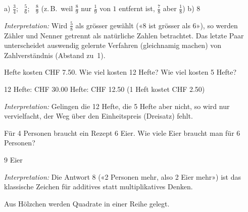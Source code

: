 \documentclass[11pt]{exam}
\newcommand{\aufgabe}[1]{%
  \needspace{8\baselineskip}%
  \renewcommand{\questionlabel}{\textbf{#1}}%
  \question}
\newcommand{\kaestchen}{\fbox{\rule{0pt}{1.1em}\hspace{1.6em}}}
\newcommand{\raum}[1]{\ifprintanswers\else\fillwithgrid{#1}\fi}
\newcommand{\diagnose}[1]{\par\smallskip\textit{Interpretation:} #1}
\begin{document}
\begin{questions}
\aufgabe{3.2}
\begin{solution}
  a) $\frac{3}{4}$; \ $\frac{5}{6}$; \ $\frac{8}{9}$ (z.\,B.\ weil $\frac{8}{9}$
  nur $\frac{1}{9}$ von $1$ entfernt ist, $\frac{7}{8}$ aber $\frac{1}{8}$)
  \qquad b) $8$
  \diagnose{Wird $\frac{5}{8}$ als grösser gewählt («8 ist grösser als 6»), so
  werden Zähler und Nenner getrennt als natürliche Zahlen betrachtet. Das letzte
  Paar unterscheidet auswendig gelernte Verfahren (gleichnamig machen) von
  Zahlverständnis (Abstand zu~1).}
\end{solution}
\raum{3.5cm}

\aufgabe{4.1}
3 Hefte kosten CHF 7.50. Wie viel kosten 12 Hefte? Wie viel kosten 5 Hefte?
\begin{solution}
  12 Hefte: CHF 30.00  Hefte: CHF 12.50 (1 Heft kostet CHF 2.50)
  \diagnose{Gelingen die 12 Hefte, die 5 Hefte aber nicht, so wird nur
  vervielfacht, der Weg über den Einheitspreis (Dreisatz) fehlt.}
\end{solution}
\raum{3cm}

\aufgabe{4.2}
Für 4 Personen braucht ein Rezept 6 Eier. Wie viele Eier braucht man für
6 Personen?
\begin{solution}
  $9$ Eier
  \diagnose{Die Antwort $8$ («2 Personen mehr, also 2 Eier mehr») ist das
  klassische Zeichen für additives statt multiplikatives Denken.}
\end{solution}
\raum{3cm}

\aufgabe{5.1}
Aus Hölzchen werden Quadrate in einer Reihe gelegt.


\end{questions}
\end{document}

